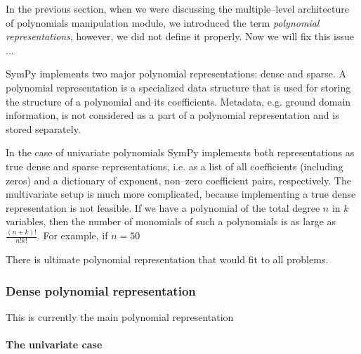 In the previous section, when we were discussing the multiple--level architecture of polynomials
manipulation module, we introduced the term \emph{polynomial representations}, however, we did not
define it properly. Now we will fix this issue ...

SymPy implements two major polynomial representations: dense and sparse. A polynomial
representation is a specialized data structure that is used for storing the structure
of a polynomial and its coefficients. Metadata, e.g. ground domain information, is not
considered as a part of a polynomial representation and is stored separately.

In the case of univariate polynomials SymPy implements both representations as true dense
and sparse representations, i.e. as a list of all coefficients (including zeros) and a
dictionary of exponent, non--zero coefficient pairs, respectively. The multivariate setup
is much more complicated, because implementing a true dense representation is not feasible.
If we have a polynomial of the total degree $n$ in $k$ variables, then the number of monomials
of such a polynomials is as large as $\frac{(n + k)!}{n! k!}$. For example, if $n = 50$

There is ultimate polynomial representation that would fit to all problems.


\subsubsection{Dense polynomial representation}

This is currently the main polynomial representation


\paragraph{The univariate case}


